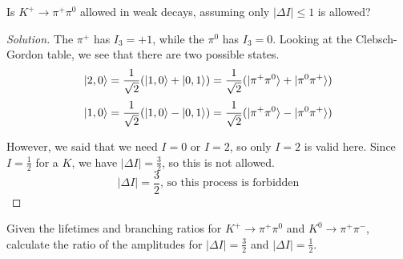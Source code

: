 \documentclass[12pt]{article}
\newenvironment{questionpart}[2][Part]{\begin{trivlist}
\item[\hskip \labelsep \hskip \labelsep {\bfseries (#2)}]}{\end{trivlist}}
\newenvironment{solution}{\begin{proof}[Solution]}{\end{proof}}
\begin{document}
\begin{questionpart}{c}
Is $K^+\rightarrow\pi^+\pi^0$ allowed in weak decays, assuming only $|\Delta I|\leq 1$ is allowed?
\end{questionpart}

\begin{solution}

The $\pi^+$ has $I_3=+1$, while the $\pi^0$ has $I_3=0$. Looking at the Clebsch-Gordon table, we see that there are two possible states.
\begin{equation*}
    \ket{2,0}=\frac{1}{\sqrt{2}}(\ket{1,0}+\ket{0,1})=\frac{1}{\sqrt{2}}(\ket{\pi^+\pi^0}+\ket{\pi^0\pi^+})
\end{equation*}
\begin{equation*}
    \ket{1,0}=\frac{1}{\sqrt{2}}(\ket{1,0}-\ket{0,1})=\frac{1}{\sqrt{2}}(\ket{\pi^+\pi^0}-\ket{\pi^0\pi^+})
\end{equation*}

However, we said that we need $I=0$ or $I=2$, so only $I=2$ is valid here. Since $I=\frac{1}{2}$ for a $K$, we have $|\Delta I|=\frac{3}{2}$, so this is not allowed.
\begin{equation*}
    \boxed{|\Delta I|=\frac{3}{2}\text{, so this process is forbidden}}
\end{equation*}

\end{solution}

\begin{questionpart}{d}
Given the lifetimes and branching ratios for $K^+\rightarrow\pi^+\pi^0$ and $K^0\rightarrow\pi^+\pi^-$, calculate the ratio of the amplitudes for $|\Delta I|=\frac{3}{2}$ and $|\Delta I|=\frac{1}{2}$.
\end{questionpart}
\end{document}
